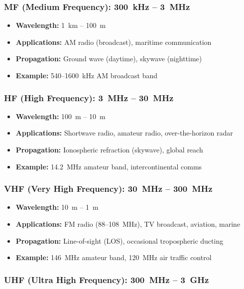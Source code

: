 \subsubsection{MF (Medium Frequency): 300~kHz -- 3~MHz}

\begin{itemize}
\item \textbf{Wavelength:} 1~km -- 100~m
\item \textbf{Applications:} AM radio (broadcast), maritime communication
\item \textbf{Propagation:} Ground wave (daytime), skywave (nighttime)
\item \textbf{Example:} 540--1600~kHz AM broadcast band
\end{itemize}

\subsubsection{HF (High Frequency): 3~MHz -- 30~MHz}

\begin{itemize}
\item \textbf{Wavelength:} 100~m -- 10~m
\item \textbf{Applications:} Shortwave radio, amateur radio, over-the-horizon radar
\item \textbf{Propagation:} Ionospheric refraction (skywave), global reach
\item \textbf{Example:} 14.2~MHz amateur band, intercontinental comms
\end{itemize}

\subsubsection{VHF (Very High Frequency): 30~MHz -- 300~MHz}

\begin{itemize}
\item \textbf{Wavelength:} 10~m -- 1~m
\item \textbf{Applications:} FM radio (88--108~MHz), TV broadcast, aviation, marine
\item \textbf{Propagation:} Line-of-sight (LOS), occasional tropospheric ducting
\item \textbf{Example:} 146~MHz amateur band, 120~MHz air traffic control
\end{itemize}

\subsubsection{UHF (Ultra High Frequency): 300~MHz -- 3~GHz}

